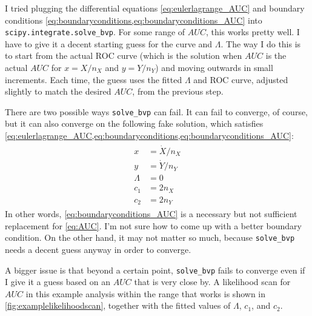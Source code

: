 \documentclass[11pt]{article}
\newcommand{\Xdot}{\dot{X}}
\newcommand{\Ydot}{\dot{Y}}
\newcommand{\AUC}{AUC}
\begin{document}
I tried plugging the differential equations \cref{eq:eulerlagrange_AUC} and boundary conditions \cref{eq:boundaryconditions,eq:boundaryconditions_AUC} into \texttt{scipy.integrate.solve\_bvp}.  For some range of \(\AUC\), this works pretty well.  I have to give it a decent starting guess for the curve and \(\Lambda\).  The way I do this is to start from the actual ROC curve (which is the solution when \(\AUC\) is the actual \(\AUC\) for \(x=X/n_X\) and \(y=Y/n_Y\)) and moving outwards in small increments.  Each time, the guess uses the fitted \(\Lambda\) and ROC curve, adjusted slightly to match the desired \(\AUC\), from the previous step.

There are two possible ways \texttt{solve\_bvp} can fail.  It can fail to converge, of course, but it can also converge on the following fake solution, which satisfies \cref{eq:eulerlagrange_AUC,eq:boundaryconditions,eq:boundaryconditions_AUC}:
\begin{align}
\begin{aligned}
x&=\Xdot/n_X \\
y&=\Ydot/n_Y \\
\Lambda&=0 \\
c_1&=2n_X \\
c_2&=2n_Y
\end{aligned}
\end{align}
In other words, \cref{eq:boundaryconditions_AUC} is a necessary but not sufficient replacement for \cref{eq:AUC}.  I'm not sure how to come up with a better boundary condition.  On the other hand, it may not matter so much, because \texttt{solve\_bvp} needs a decent guess anyway in order to converge.

A bigger issue is that beyond a certain point, \texttt{solve\_bvp} fails to converge even if I give it a guess based on an \(\AUC\) that is very close by.  A likelihood scan for \(\AUC\) in this example analysis within the range that works is shown in \cref{fig:examplelikelihoodscan}, together with the fitted values of \(\Lambda\), \(c_1\), and \(c_2\).
\end{document}

